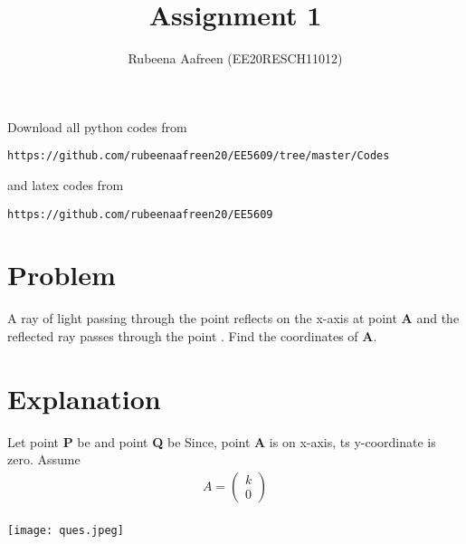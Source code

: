 \documentclass[journal,12pt,twocolumn]{IEEEtran}
\begin{document}
     \def\rightbox#1{\makebox[0in][r]{#1}}
     \def\centbox#1{\makebox[0in]{#1}}
     \def\topbox#1{\raisebox{-\baselineskip}[0in][0in]{#1}}
     \def\midbox#1{\raisebox{-0.5\baselineskip}[0in][0in]{#1}}
\vspace{3cm}
\title{Assignment 1}
\author{Rubeena Aafreen (EE20RESCH11012)}
\maketitle
\newpage
\bigskip
\renewcommand{\thefigure}{\theenumi}
\renewcommand{\thetable}{\theenumi}
Download all python codes from 
\begin{lstlisting}
https://github.com/rubeenaafreen20/EE5609/tree/master/Codes
\end{lstlisting}
%
and latex codes from 
%
\begin{lstlisting}
https://github.com/rubeenaafreen20/EE5609
\end{lstlisting}
%
\section{Problem}

A ray of light passing through the point 
reflects on the x-axis at point \textbf{A} and the reflected ray passes through the point . Find
the coordinates of \textbf{A}.

\section{Explanation}
Let point \textbf{P} be  and point \textbf{Q} be 
Since, point \textbf{A} is on x-axis, ts y-coordinate is zero.
Assume \begin{align}
    A=\begin{pmatrix} k \\ 0 \end{pmatrix}
\end{align} \\

\texttt{[image: ques.jpeg]}
\end{document}
